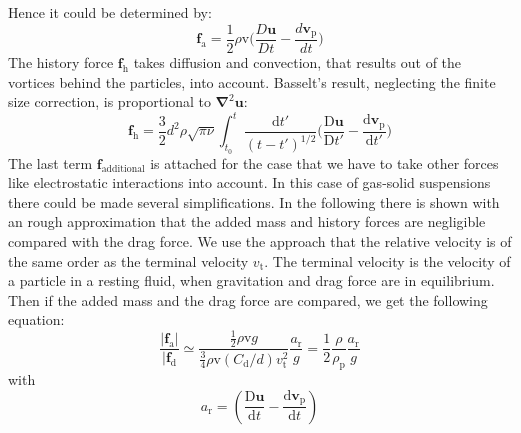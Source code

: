 \documentclass[a4paper,12pt]{article}
\renewcommand*\vec[1]{\boldsymbol{#1}}
\numberwithin{equation}{section} %
\begin{document}
Hence it could be determined by:
\begin{equation}
\vec{f}_\mathrm{a} =  \frac{1}{2}\rho \mathrm{v} \biggl(\frac{D\vec{u}}{Dt}-\frac{d\vec{v}_\mathrm{p}}{dt}\biggl)
\end{equation}
The history force $\vec{f}_\mathrm{h}$ takes diffusion and convection, that results out of the vortices behind the particles, into account. Basselt's result, neglecting the finite size correction, is proportional to $\vec\nabla^\mathrm{2}\vec{u}$:
\begin{equation}
\vec{f}_\mathrm{h} = \frac{3}{2}d^\mathrm{2}\rho\sqrt{\pi\nu}\int_{t_\mathrm{0}}^{t} \frac{\mathrm{d}t'}{(t-t')^\mathrm{1/2}} \biggl(\frac{\mathrm{D}\vec{u}}{\mathrm{D}t'}- \frac{\mathrm{d}\vec{v}_\mathrm{p}}{\mathrm{d}t'}\biggl)  
\end{equation}
The last term $\vec{f}_\mathrm{additional}$ is attached for the case that we have to take other forces like electrostatic interactions into account.
In this case of gas-solid suspensions there could be made several simplifications.
In the following there is shown with an rough approximation that the added mass and history forces are negligible compared with the drag force.
We use the approach that the relative velocity is of the same order as the terminal velocity $v_\mathrm{t}$. The terminal velocity is the velocity of a particle in a resting fluid, when gravitation and drag force are in equilibrium. Then if the added mass and the drag force are compared, we get the following equation:
\begin{equation}
\frac{|\vec{f}_\mathrm{a}|}{|\vec{f}_\mathrm{d}} \simeq \frac{\frac{1}{2} \rho \mathrm{v} g}{\frac{3}{4} \rho \mathrm{v}(C_\mathrm{d}/d) v_\mathrm{t}^\mathrm{2}}\frac{a_\mathrm{r}}{g} = \frac{1}{2}\frac{\rho}{\rho_\mathrm{p}}\frac{a_\mathrm{r}}{g}
\end{equation}
with 
\begin{equation}
a_\mathrm{r}=(\frac{\mathrm{D}\vec{u}}{\mathrm{d}t}-\frac{\mathrm{d}\vec{v}_\mathrm{p}}{\mathrm{d}t})
\end{equation}
\end{document}
